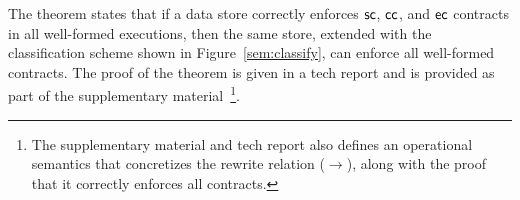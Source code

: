 \noindent The theorem states that if a data store correctly enforces ${\sf sc}$,
${\sf cc}$, and ${\sf ec}$ contracts in all well-formed executions, then the same
store, extended with the classification scheme shown in
Figure~\ref{sem:classify}, can enforce all well-formed \name contracts. The
proof of the theorem is given in a tech report and is provided
as part of the supplementary material~\cite{techrep}\footnote{The
  supplementary material and tech report also defines an operational
  semantics that concretizes the rewrite relation ($\xrightarrow{}$), along
  with the proof that it correctly enforces all \name contracts.}.


